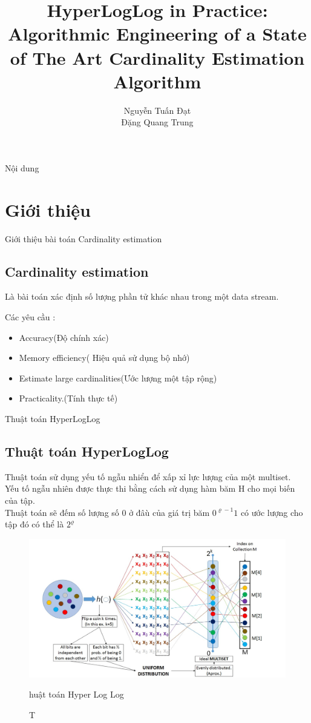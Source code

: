 \documentclass{beamer}
\title[]{{\bf \large HyperLogLog in Practice: Algorithmic Engineering of a
State of The Art Cardinality Estimation Algorithm } \\
}
\author[]{
Nguyễn Tuấn Đạt \\%
Đặng Quang Trung%
}
\institute[]{

}
\begin{document}
\begin{frame}
\titlepage
\end{frame}

\begin{frame}{Nội dung}
\tableofcontents
\end{frame}
\section{Giới thiệu}

\begin{frame}{Giới thiệu bài toán Cardinality estimation}
\subsection{Cardinality estimation}
Là bài toán xác định số lượng phần tử khác nhau trong một data stream. 

Các yêu cầu :
\begin{itemize}
\item Accuracy(Độ chính xác)
\item Memory efficiency( Hiệu quả sử dụng bộ nhớ)
\item Estimate large cardinalities(Ước lượng một tập rộng)
\item Practicality.(Tính thực tế)
\end{itemize}

\end{frame}
\begin{frame}{Thuật toán HyperLogLog}
\subsection{Thuật toán HyperLogLog}
Thuật toán sử dụng yếu tố ngẫu nhiển để xấp xỉ lực lượng của một multiset.\\
Yếu tố ngẫu nhiên được thực thi bằng cách sử dụng hàm băm H cho mọi biến của tập.\\
Thuật toán sẽ đếm số lượng số 0 ở đâù của giá trị băm $ 0^{\varrho-1} 1 $ có ước lượng cho tập đó có thể là $ 2^\varrho$ 
\end{frame}
\begin{frame}
\begin{figure}[h]
\includegraphics[scale=0.2]{HLL.png}
\caption Thuật toán Hyper Log Log
\end{figure}
\end{frame}
\end{document}

